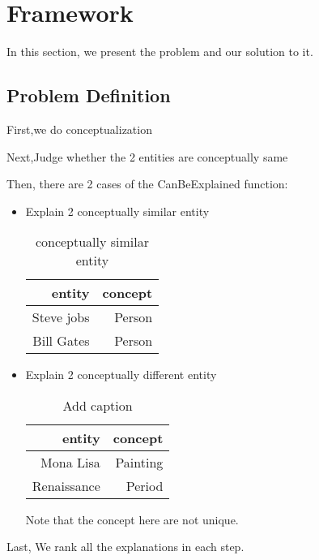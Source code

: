 \section{Framework}

In this section, we present the problem and our solution to it.

\subsection{Problem Definition}


First,we do conceptualization

Next,Judge whether the 2 entities are conceptually same

Then, there are 2 cases of the CanBeExplained function:

\begin{itemize}
\item Explain 2 conceptually similar entity

\begin{table}[htbp]
  \centering
  \caption{conceptually similar entity}
    \begin{tabular}{rr}
    \toprule
    entity & concept \\
    \midrule
    Steve jobs & Person \\
    Bill Gates & Person \\
    \bottomrule
    \end{tabular}%
  \label{tab:addlabel}%
\end{table}%


\item Explain 2 conceptually different entity
\begin{table}[htbp]
  \centering
  \caption{Add caption}
    \begin{tabular}{rr}
    \toprule
    entity & concept \\
    \midrule
    Mona Lisa & Painting \\
    Renaissance & Period \\
    \bottomrule
    \end{tabular}%
  \label{tab:addlabel}%
\end{table}%

Note that the concept here are not unique.

\end{itemize}


Last, We rank all the explanations in each step.



